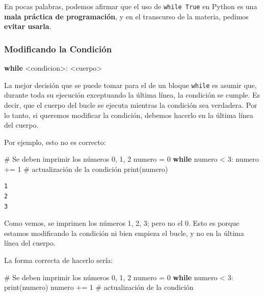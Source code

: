 \documentclass[
  letterpaper,
  DIV=11,
  numbers=noendperiod]{scrreprt}
\newenvironment{Shaded}{\begin{snugshade}}{\end{snugshade}}
\newcommand{\BuiltInTok}[1]{\textcolor[rgb]{0.00,0.23,0.31}{#1}}
\newcommand{\CommentTok}[1]{\textcolor[rgb]{0.37,0.37,0.37}{#1}}
\newcommand{\ControlFlowTok}[1]{\textcolor[rgb]{0.00,0.23,0.31}{\textbf{#1}}}
\newcommand{\DecValTok}[1]{\textcolor[rgb]{0.68,0.00,0.00}{#1}}
\newcommand{\NormalTok}[1]{\textcolor[rgb]{0.00,0.23,0.31}{#1}}
\newcommand{\OperatorTok}[1]{\textcolor[rgb]{0.37,0.37,0.37}{#1}}
\begin{document}
En pocas palabras, podemos afirmar que el uso de \texttt{while\ True} en
Python es una \textbf{mala práctica de programación}, y en el transcurso
de la materia, pedimos \textbf{evitar usarla}.

\subsubsection{Modificando la
Condición}\label{modificando-la-condiciuxf3n}

\begin{Shaded}
\begin{Highlighting}[]
\ControlFlowTok{while} \OperatorTok{\textless{}}\NormalTok{condicion}\OperatorTok{\textgreater{}}\NormalTok{:}
  \OperatorTok{\textless{}}\NormalTok{cuerpo}\OperatorTok{\textgreater{}}
\end{Highlighting}
\end{Shaded}

La mejor decisión que se puede tomar para el de un bloque \texttt{while}
es asumir que, durante toda su ejecución exceptuando la última línea, la
condición se cumple. Es decir, que el cuerpo del bucle se ejecuta
mientras la condición sea verdadera. Por lo tanto, si queremos modificar
la condición, debemos hacerlo en la última línea del cuerpo.

Por ejemplo, esto no es correcto:

\begin{Shaded}
\begin{Highlighting}[]
\CommentTok{\# Se deben imprimir los números 0, 1, 2}
\NormalTok{numero }\OperatorTok{=} \DecValTok{0}
\ControlFlowTok{while}\NormalTok{ numero }\OperatorTok{\textless{}} \DecValTok{3}\NormalTok{:}
\NormalTok{  numero }\OperatorTok{+=} \DecValTok{1}     \CommentTok{\# actualización de la condición}
  \BuiltInTok{print}\NormalTok{(numero)}
\end{Highlighting}
\end{Shaded}

\begin{verbatim}
1
2
3
\end{verbatim}

Como vemos, se imprimen los números 1, 2, 3; pero no el 0. Esto es
porque estamos modificando la condición ni bien empieza el bucle, y no
en la última línea del cuerpo.

La forma correcta de hacerlo sería:

\begin{Shaded}
\begin{Highlighting}[]
\CommentTok{\# Se deben imprimir los números 0, 1, 2}
\NormalTok{numero }\OperatorTok{=} \DecValTok{0}
\ControlFlowTok{while}\NormalTok{ numero }\OperatorTok{\textless{}} \DecValTok{3}\NormalTok{:}
  \BuiltInTok{print}\NormalTok{(numero)}
\NormalTok{  numero }\OperatorTok{+=} \DecValTok{1}     \CommentTok{\# actualización de la condición}
\end{Highlighting}
\end{Shaded}
\end{document}
